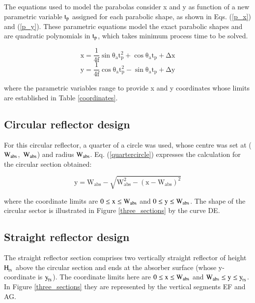 The equations used to model the parabolas consider x and y as function of a new parametric variable $\rm{t_p}$ assigned for each parabolic shape, as shown in Eqs. (\ref{p_x}) and (\ref{p_y}). These parametric equations model the exact parabolic shapes and are quadratic polynomials in $\rm{t_p}$, which takes minimum process time to be solved. 

\begin{equation}
	\mathrm{x = \frac{1}{4f}\sin\theta_a t_{p}^2 + \cos\theta_a t_p + \Delta x}
	\label{p_x}
\end{equation}
\vspace*{-0.75cm}
\begin{equation}
	\mathrm{y = \frac{1}{4f}\cos\theta_a t_{p}^2 - \sin\theta_a t_p + \Delta y}
	\label{p_y}
\end{equation}

\noindent where the parametric variables range to provide x and y coordinates whose limits are established in Table \ref{coordinates}.

\subsection{Circular reflector design}

For this circular reflector, a quarter of a circle was used, whose centre was set at \mbox{($\rm{W_{abs}}$, $\rm{W_{abs}}$)} and radius $\rm{W_{abs}}$. Eq. (\ref{quartercircle}) expresses the calculation for the circular section obtained:

\begin{equation}
	\mathrm{{y} = {W_{abs}} - \sqrt {\mathrm{W_{abs}^2 - {{\left( {{x} - {W_{abs}}} \right)}^2}}}}
	\label{quartercircle}
\end{equation}

\noindent where the coordinate limits are $\rm{0 \le {x} \le {W_{abs}}}$ and $\rm{0 \le {y} \le {W_{abs}}}$. The shape of the circular sector is illustrated in Figure \ref{three_sections} by the curve DE. 

\subsection{Straight reflector design}

The straight reflector section comprises two vertically straight reflector of height $\rm{H_{\!_{TS}}}$ above the circular section and ends at the absorber surface (whose y-coordinate is $\rm{y_{\!_{TS}}}$). The coordinate limits here are $\rm{0 \le {x} \le {W_{abs}}}$ and $\rm{W_{abs} \le {y} \le {y_{\!_{TS}}}}$. In Figure \ref{three_sections} they are represented by the vertical segments EF and AG.

